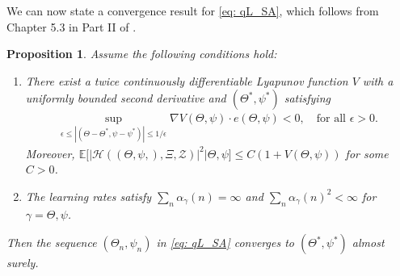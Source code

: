 \documentclass[11pt]{article}
\newtheorem{proposition}{Proposition}
\newtheorem{assumption}{Assumption}
\begin{document}
We can now state a convergence result for \eqref{eq: qL_SA}, which follows from Chapter 5.3 in Part II of \cite{benveniste2012adaptive}.





\begin{proposition}\label{prop:SA-convergence}
   Assume the following conditions hold:
   \begin{enumerate}

    \item There exist a twice continuously differentiable Lyapunov function $V$ with a uniformly bounded second derivative and  $(\Theta^*, \psi^*)$ satisfying
    \begin{align*}
    \sup_{\epsilon \le |(\Theta - \Theta^*, \psi - \psi^*)| \le 1/\epsilon }\nabla V(\Theta, \psi) \cdot e (\Theta, \psi) <0, \quad \text{for all $\epsilon>0$. }
    \end{align*}
    Moreover, $\mathbb{E} \big[|\mathcal{H}((\Theta, \psi, ), \Xi, \mathcal{Z})|^2\big| \Theta, \psi\big] \le C(1 + V(\Theta, \psi))$ for some $C>0$.


    \item The learning rates satisfy $\sum_{n} \alpha_{\gamma}(n) = \infty$ and  $\sum_{n} \alpha_{\gamma}(n)^2 < \infty$ for $\gamma= \Theta, \psi$.
\end{enumerate}
Then the sequence $(\Theta_n, \psi_n)$ in \eqref{eq: qL_SA} converges to $(\Theta^*, \psi^*)$ almost surely.
\end{proposition}
\end{document}
